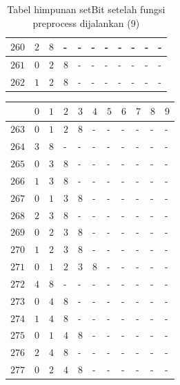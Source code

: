 \begin{appendices}
\begin{table}[H]
\begin{tabular} {|l|l|l|l|l|l|l|l|l|l|l|}
  		$ 260 $ & $ 2 $ &$ 8 $ & - &  - &  - &  - &  - &  - &  - &  -   \\ \hline
  		$ 261 $ & $ 0 $ &$ 2 $ &$ 8 $ & - &  - &  - &  - &  - &  - &  -   \\ \hline
  		$ 262 $ & $ 1 $ &$ 2 $ &$ 8 $ & - &  - &  - &  - &  - &  - &  -   \\ \hline  		
  	\end{tabular}\caption{Tabel himpunan setBit setelah fungsi preprocess dijalankan (9)}
  	\label{tab:setbit_9}
  \end{table}
  \begin{table}[H]
  	\centering
  	\begin{tabular} {|l|l|l|l|l|l|l|l|l|l|l|} \hline
  		\backslashbox{$Num$}{$index$} & $ 0 $ & $ 1 $ & $ 2 $ & $ 3 $ & $ 4 $ & $ 5 $ & $ 6 $ & $ 7 $ & $ 8 $ & $ 9 $ \\ \hline
  		$ 263 $ & $ 0 $ &$ 1 $ &$ 2 $ &$ 8 $ & - &  - &  - &  - &  - &  -   \\ \hline
  		$ 264 $ & $ 3 $ &$ 8 $ & - &  - &  - &  - &  - &  - &  - &  -   \\ \hline
  		$ 265 $ & $ 0 $ &$ 3 $ &$ 8 $ & - &  - &  - &  - &  - &  - &  -   \\ \hline
  		$ 266 $ & $ 1 $ &$ 3 $ &$ 8 $ & - &  - &  - &  - &  - &  - &  -   \\ \hline
  		$ 267 $ & $ 0 $ &$ 1 $ &$ 3 $ &$ 8 $ & - &  - &  - &  - &  - &  -   \\ \hline
  		$ 268 $ & $ 2 $ &$ 3 $ &$ 8 $ & - &  - &  - &  - &  - &  - &  -   \\ \hline
  		$ 269 $ & $ 0 $ &$ 2 $ &$ 3 $ &$ 8 $ & - &  - &  - &  - &  - &  -   \\ \hline
  		$ 270 $ & $ 1 $ &$ 2 $ &$ 3 $ &$ 8 $ & - &  - &  - &  - &  - &  -   \\ \hline
  		$ 271 $ & $ 0 $ &$ 1 $ &$ 2 $ &$ 3 $ &$ 8 $ & - &  - &  - &  - &  -   \\ \hline
  		$ 272 $ & $ 4 $ &$ 8 $ & - &  - &  - &  - &  - &  - &  - &  -   \\ \hline
  		$ 273 $ & $ 0 $ &$ 4 $ &$ 8 $ & - &  - &  - &  - &  - &  - &  -   \\ \hline
  		$ 274 $ & $ 1 $ &$ 4 $ &$ 8 $ & - &  - &  - &  - &  - &  - &  -   \\ \hline
  		$ 275 $ & $ 0 $ &$ 1 $ &$ 4 $ &$ 8 $ & - &  - &  - &  - &  - &  -   \\ \hline
  		$ 276 $ & $ 2 $ &$ 4 $ &$ 8 $ & - &  - &  - &  - &  - &  - &  -   \\ \hline
  		$ 277 $ & $ 0 $ &$ 2 $ &$ 4 $ &$ 8 $ & - &  - &  - &  - &  - &  -   \\ \hline

\end{tabular}
\end{table}
\end{appendices}
